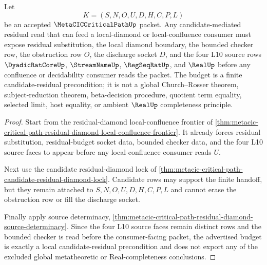 \begin{theorem}
\label{thm:metacic-critical-path-candidate-residual-local-diamond-budget}
Let
$$
K=(S,N,O,U,D,H,C,P,L)
$$
be an accepted $\MetaCICCriticalPathUp$ packet. Any candidate-mediated residual read that can feed a local-diamond or local-confluence consumer must expose residual substitution, the local diamond boundary, the bounded checker row, the obstruction row $O$, the discharge socket $D$, and the four L10 source rows $\DyadicRatCoreUp$, $\StreamNameUp$, $\RegSeqRatUp$, and $\RealUp$ before any confluence or decidability consumer reads the packet. The budget is a finite candidate-residual precondition; it is not a global Church--Rosser theorem, subject-reduction theorem, beta-decision procedure, quotient term equality, selected limit, host equality, or ambient $\RealUp$ completeness principle.
\end{theorem}
\begin{proof}
Start from the residual-diamond local-confluence frontier of \autoref{thm:metacic-critical-path-residual-diamond-local-confluence-frontier}. It already forces residual substitution, residual-budget socket data, bounded checker data, and the four L10 source faces to appear before any local-confluence consumer reads $U$.

Next use the candidate residual-diamond lock of \autoref{thm:metacic-critical-path-candidate-residual-diamond-lock}. Candidate rows may support the finite handoff, but they remain attached to $S,N,O,U,D,H,C,P,L$ and cannot erase the obstruction row or fill the discharge socket.

Finally apply source determinacy, \autoref{thm:metacic-critical-path-residual-diamond-source-determinacy}. Since the four L10 source faces remain distinct rows and the bounded checker is read before the consumer-facing packet, the advertised budget is exactly a local candidate-residual precondition and does not export any of the excluded global metatheoretic or Real-completeness conclusions.
\end{proof}
